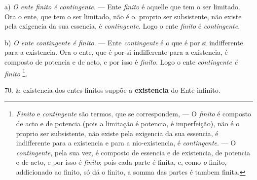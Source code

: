 a) \emph{O ente finito é contingente}. --- Ente \emph{finito} é aquelle que tem o ser limitado. Ora o ente, que tem o ser limitado, não é o. proprio ser subsistente, não existe pela exigencia da sua essencia, é \emph{contingente}. Logo o ente \emph{finito} é \emph{contingente}.

b) \emph{O ente contingente é finito}. --- Ente \emph{contingente} é o que é por si indifferente para a existencia. Ora o ente, que é por si indifferente para a existencia, é composto de potencia e de acto, e por isso é \emph{finito}. Logo o ente \emph{contingente é finito} \footnote{\emph{Finito} e \emph{contingente} são termos, que se correspondem, --- O \emph{finito} é composto de acto e de potencia (pois a limitação é potencia, é imperfeição), não é o proprio ser subsistente, não existe pela exigencia da sua essencia, é indifferente para a existencia e para a nio-existencia, é \emph{contingente}. --- O \emph{contingente}, pela sua vez, é composto de essencia e de existencia, de potencia e dc acto, e por isso é \emph{finito}; pois cada parte é finita, e, como \emph{o} finito, addicionado ao finito, só dá o finito, a somma das partes é tambem finita.}.

70. \& existencia dos entes finitos suppõe a \textbf{existencia} do Ente infinito.

